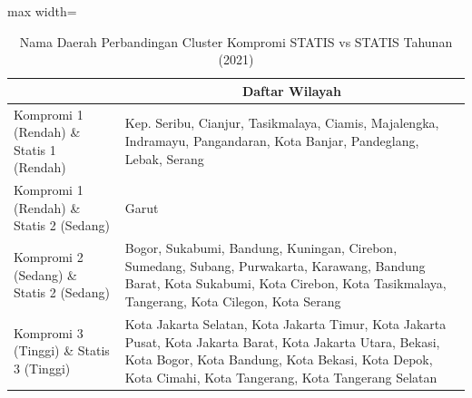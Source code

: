 \begin{table}[H]
\centering
\caption{Nama Daerah Perbandingan Cluster Kompromi STATIS vs STATIS Tahunan (2021)} \label{tab:app1comp_statis_name_2021}
\begin{adjustbox}{max width=\textwidth}
\begin{tabular}{|>{\centering\arraybackslash}p{4cm}|p{10cm}|}
\hline
\multicolumn{1}{|c|}{\textbf{Kategori}} & \multicolumn{1}{c|}{\textbf{Daftar Wilayah}} \\
\hline
Kompromi 1 (Rendah) \& Statis 1 (Rendah) & Kep. Seribu, Cianjur, Tasikmalaya, Ciamis, Majalengka, Indramayu, Pangandaran, Kota Banjar, Pandeglang, Lebak, Serang \\
\hline
Kompromi 1 (Rendah) \& Statis 2 (Sedang) & Garut \\
\hline
Kompromi 2 (Sedang) \& Statis 2 (Sedang) & Bogor, Sukabumi, Bandung, Kuningan, Cirebon, Sumedang, Subang, Purwakarta, Karawang, Bandung Barat, Kota Sukabumi, Kota Cirebon, Kota Tasikmalaya, Tangerang, Kota Cilegon, Kota Serang \\
\hline
Kompromi 3 (Tinggi) \& Statis 3 (Tinggi) & Kota Jakarta Selatan, Kota Jakarta Timur, Kota Jakarta Pusat, Kota Jakarta Barat, Kota Jakarta Utara, Bekasi, Kota Bogor, Kota Bandung, Kota Bekasi, Kota Depok, Kota Cimahi, Kota Tangerang, Kota Tangerang Selatan \\
\hline
\end{tabular}
\end{adjustbox}
\end{table}